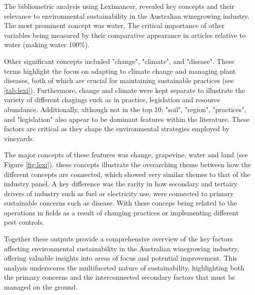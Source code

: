 

The bibliometric analysis using Leximancer, revealed key concepts and their relevance to environmental sustainability in the Australian winegrowing industry. The most prominent concept was water. The critical importance of other variables being measured by their comparative appearance in articles relative to water (making water 100\%).

Other significant concepts included "change", "climate", and "disease". These terms highlight the focus on adapting to climate change and managing plant diseases, both of which are crucial for maintaining sustainable practices (see \ref{tab:lexi}). Furthermore, change and climate were kept separate to illustrate the variety of different chagings such as in practice, legislation and resource abundance. Additionally, although not in the top 10; "soil", "region", "practices", and "legislation" also appear to be dominant features within the literature. These factors are critical as they shape the environmental strategies employed by vineyards.

The major concepts of these features was change, grapevine, water and land (see Figure \ref{fig:lexi}). these concepts illustrate the overarching theme between how the different concepts are connected, which showed very similar themes to that of the industry panel. A key difference was the rarity in how secondary and tertairy drivers of industry such as fuel or electricity use, were connected to primary sustainable concerns such as disease. With these conceps being related to the operations in fields as a result of changing practices or implementing different pest controls.

Together these outputs provide a comprehensive overview of the key factors affecting environmental sustainability in the Australian winegrowing industry, offering valuable insights into areas of focus and potential improvement. This analysis underscores the multifaceted nature of sustainability, highlighting both the primary concerns and the interconnected secondary factors that must be managed on the ground.

